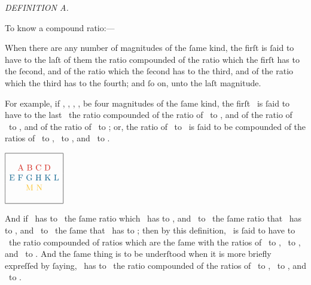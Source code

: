 \documentclass[12pt,preview]{standalone}
\begin{document}
\begin{minipage}{\textwidth}

    \begin{center}
        \textit{DEFINITION A.}\label{book5defA} \\
    \end{center}

    \hfill

    \raggedright To know a compound ratio:---

    \hfill

    When there are any number of magnitudes of the ſame kind, the firſt is ſaid to have to the laſt of them the ratio compounded of the ratio which the firſt has to the ſecond, and of the ratio which the ſecond has to the third, and of the ratio which the third has to the fourth; and ſo on, unto the laſt magnitude.

    \hfill

    \begin{minipage}{0.75\textwidth}
        For example, if \redA, \redB, \redC, \redD, be four magnitudes of the ſame kind, the firſt \redA\ is ſaid to have to the last \redD\ the ratio compounded of the ratio of \redA\ to \redB, and of the ratio of \redB\ to \redC, and of the ratio of \redC\ to \redD; or, the ratio of \redA\ to \redD\ is ſaid to be compounded of the ratios of \redA\ to \redB, \redB\ to \redC, and \redC\ to \redD.
    \end{minipage}%
    \begin{minipage}{0.25\textwidth}
        \hspace{4ex}$\begin{array}{|c|} \hline\\ \text{\redA}\ \text{\redB}\ \text{\redC}\ \text{\redD} \\ \text{\blueE}\ \text{\blueF}\ \text{\blueG}\ \text{\blueH}\ \text{\blueK}\ \text{\blueL} \\ \text{\yellowM}\ \text{\yellowN} \\ \\ \hline \end{array}$
    \end{minipage}

    \hfill

    \hfill

    And if \redA\ has to \redB\ the ſame ratio which \blueE\ has to \blueF, and \redB\ to \redC\ the ſame ratio that \blueG\ has to \blueH, and \redC\ to \redD\ the ſame that \blueK\ has to \blueL; then by this definition, \redA\ is ſaid to have to \redD\ the ratio compounded of ratios which are the ſame with the ratios of \blueE\ to \blueF, \blueG\ to \blueH, and \blueK\ to \blueL. And the ſame thing is to be underſtood when it is more briefly expreſſed by ſaying, \redA\ has to \redD\ the ratio compounded of the ratios of \blueE\ to \blueF, \blueG\ to \blueH, and \blueK\ to \blueL.


\end{minipage}
\end{document}
